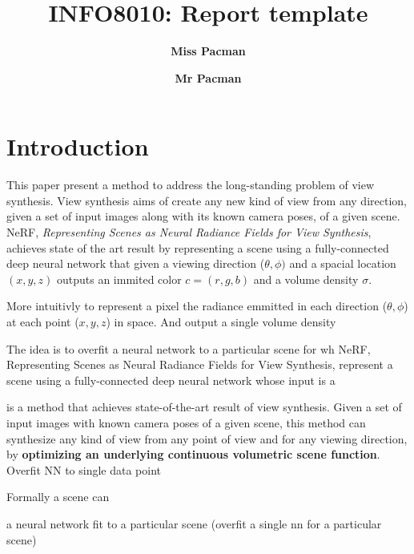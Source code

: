 \documentclass[twocolumn,superscriptaddress,aps]{revtex4-1}
\begin{document}

\title{\Large{INFO8010: Report template}}
\vspace{1cm}
\author{\small{\bf Miss Pacman}}
\author{\small{\bf Mr Pacman}}

\maketitle


\section{Introduction}
This paper present a method to address the long-standing problem of view synthesis.  View synthesis aims of create any new kind of view from any direction,
given a set of input images along with its known camera poses, of a given scene. NeRF, \textit{ Representing Scenes as Neural Radiance Fields for View Synthesis}, achieves state of the art result by representing a scene using a fully-connected deep neural network that given a viewing direction ($\theta, \phi)$ and a spacial location$(x, y, z)$ outputs an immited color $c=(r,g,b)$ and a volume density $\sigma$.


More intuitivly to represent a pixel 
\bigskip
the radiance emmitted in each direction ($\theta, \phi$) at each point ($x, y, z$) in space. And output a single volume density 
\bigskip

The idea is to overfit a neural network to a particular scene for wh
\bigskip
NeRF, Representing Scenes as Neural Radiance Fields for View Synthesis, represent a scene using a fully-connected deep neural network whose input is a 


is a method that achieves state-of-the-art result of view synthesis. Given a set of input images with known camera poses of a given scene, this method can synthesize any kind of view from any point of view and for any viewing direction, by \textbf{optimizing an underlying continuous volumetric scene function}. Overfit NN to single data point

Formally a scene can 

a neural network fit to a particular scene (overfit a single nn for a particular scene)
\end{document}
